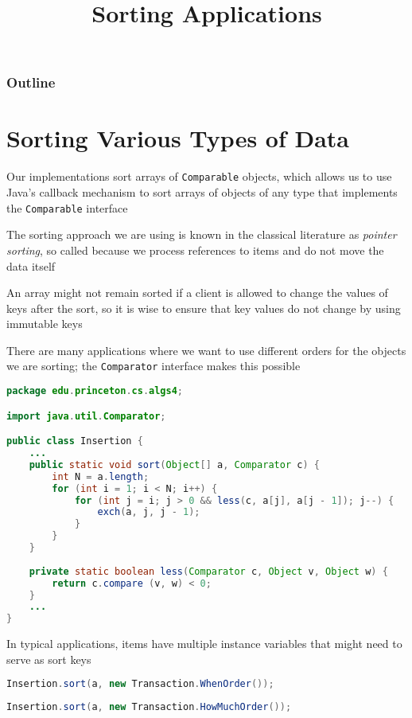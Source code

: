 \documentclass[8pt,a4paper,compress]{beamer}
\title{Sorting Applications}
\date{}
\begin{document}
\begin{frame}
\vfill
\titlepage
\end{frame}

\begin{frame}
\frametitle{Outline}
\tableofcontents
\end{frame}

\section{Sorting Various Types of Data}
\begin{frame}[fragile]
Our implementations sort arrays of \lstinline$Comparable$ objects, which allows us to use Java's callback mechanism to sort arrays of objects of any type that implements the \lstinline$Comparable$ interface

\bigskip

The sorting approach we are using is known in the classical literature as \emph{pointer sorting}, so called because we process references to items and do not move the data itself

\bigskip

An array might not remain sorted if a client is allowed to change the values of keys after the sort, so it is wise to ensure that key values do not change by using immutable keys
\end{frame}

\begin{frame}[fragile]
There are many applications where we want to use different orders for the objects we are sorting; the \lstinline$Comparator$ interface makes this possible
\begin{lstlisting}[language=Java]
package edu.princeton.cs.algs4;

import java.util.Comparator;

public class Insertion {
    ...
    public static void sort(Object[] a, Comparator c) {
        int N = a.length;
        for (int i = 1; i < N; i++) {
            for (int j = i; j > 0 && less(c, a[j], a[j - 1]); j--) {
                exch(a, j, j - 1);
            }
        }
    }
    
    private static boolean less(Comparator c, Object v, Object w) {     
        return c.compare (v, w) < 0; 
    }
    ...
}
\end{lstlisting}

\bigskip

In typical applications, items have multiple instance variables that might need to serve as sort keys
\begin{lstlisting}[language=Java]
Insertion.sort(a, new Transaction.WhenOrder());
\end{lstlisting}

\begin{lstlisting}[language=Java]
Insertion.sort(a, new Transaction.HowMuchOrder());
\end{lstlisting}
\end{frame}
\end{document}
